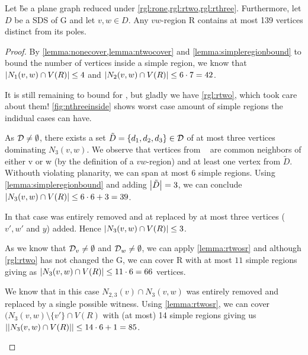 \begin{lemma}\label{lemma:inside}
    Let \G be a plane graph reduced under \cref{rgl:rone,rgl:rtwo,rgl:rthree}. Furthermore, let $D$ be a SDS of G and let $v,w \in D$. Any $vw$-region R contains at most 139 vertices distinct from its poles.
\end{lemma}
\begin{proof} 
    By \cref{lemma:nonecover,lemma:ntwocover} and \cref{lemma:simpleregionbound} to bound the number of vertices inside a simple region, we know that $\abs{N_1(v,w) \cap V(R)} \leq 4$ and $\abs{N_2(v,w) \cap V(R)} \leq 6 \cdot 7 = 42$.
    
    It is still remaining to bound for \nthi, but gladly we have \cref{rgl:rtwo}, which took care about them! \cref{fig:nthreeinside} shows worst case amount of simple regions the indidual cases can have.
    
    \begin{caseofz}
         As $\mathcal{D} \neq \emptyset$, there exists a set $\tilde D = \{d_1,d_2,d_3\} \in \mathcal{D}$ of at most three vertices dominating $N_3(v,w)$. We observe that vertices from \nthi~ are common neighbors of either v or w (by the definition of a $vw$-region) and at least one vertex from $\tilde D$. Withouth violating planarity, we can span at most 6 simple regions. Using \cref{lemma:simpleregionbound} and adding $\abs{\tilde D} = 3$, we can conclude $\abs{N_3(v,w) \cap V(R)} \leq 6 \cdot 6 + 3 = 39$.
        
        In that case \ntwi was entirely removed and at \nthi replaced by at most three vertices ($v', w'$ and $y$) added. Hence $\abs{N_3(v,w) \cap V(R)} \leq 3$.
        
         As we know that $\mathcal{D}_{v} \neq \emptyset$ and $\mathcal{D}_{w} \neq \emptyset$, we can apply \cref{lemma:rtwosr} and although \cref{rgl:rtwo} has not changed the G, we can cover R with at most $11$ simple regions giving as $\abs{N_3(v,w) \cap V(R)} \leq 11 \cdot 6 = 66$ vertices. 
        
         We know that in this case $N_{2,3}(v) \cap N_3(v,w)$ was entirely removed and replaced by a single possible witness. Using \cref{lemma:rtwosr}, we can cover $(N_3(v,w) \setminus \{v'\} \cap V(R)$ with (at most) 14 simple regions giving us $\abs{\abs{N_3(v,w) \cap V(R)}} \leq 14 \cdot 6 + 1 = 85$.
    \end{caseofz}
    

\end{proof}
